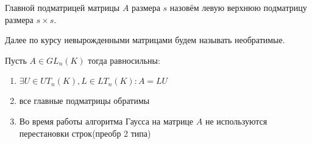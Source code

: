 \begin{definition}
    Главной подматрицей матрицы $A$ размера $s$ назовём левую верхнюю подматрицу
    размера $s\times s$.
\end{definition}
\begin{remark}
    Далее по курсу невырожденными матрицами будем называть необратимые.
\end{remark}
\begin{theorem}
    Пусть $A\in GL_n(K)$ тогда равносильны:
    \begin{enumerate}
        \item $\exists U\in UT_n(K), L\in LT_n(K)\colon A = LU$
        \item все главные подматрицы обратимы
        \item Во время работы алгоритма Гаусса на матрице $A$ не используются перестановки строк(преобр 2 типа) 
    \end{enumerate}
\end{theorem}
